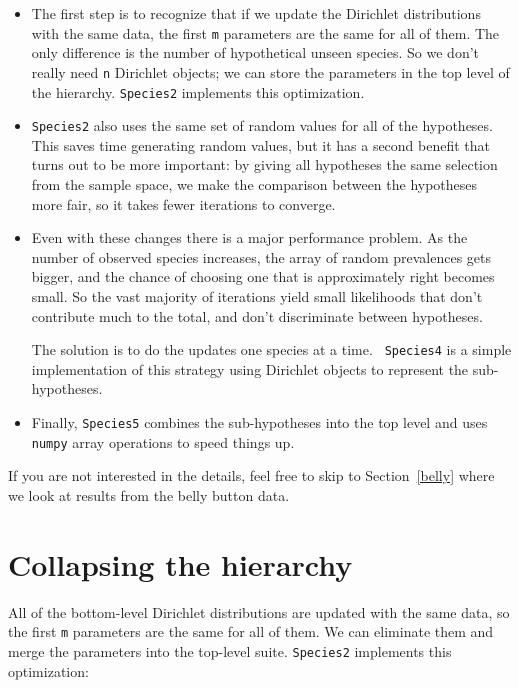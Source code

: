 \documentclass[12pt]{book}
\theoremstyle{exercise}
\begin{document}
\begin{itemize}

\item The first step is to recognize that if we update the Dirichlet
  distributions with the same data, the first {\tt m} parameters are
  the same for all of them.  The only difference is the number of
  hypothetical unseen species.  So we don't really need {\tt n}
  Dirichlet objects; we can store the parameters in the top level of
  the hierarchy.  {\tt Species2} implements this optimization.

\item {\tt Species2} also uses the same set of random values for all
  of the hypotheses.  This saves time generating random values, but it
  has a second benefit that turns out to be more important: by giving
  all hypotheses the same selection from the sample space, we make
  the comparison between the hypotheses more fair, so it takes
  fewer iterations to converge.

\item Even with these changes there is a major performance problem.
  As the number of observed species increases, the array of random
  prevalences gets bigger, and the chance of choosing one that is
  approximately right becomes small.  So the vast majority of
  iterations yield small likelihoods that don't contribute much to the
  total, and don't discriminate between hypotheses.

  The solution is to do the updates one species at a time.  {\tt
  Species4} is a simple implementation of this strategy using
  Dirichlet objects to represent the sub-hypotheses.

\item Finally, {\tt Species5} combines the sub-hypotheses into the top
  level and uses {\tt numpy} array operations to speed things up.

\end{itemize}

If you are not interested in the details, feel free to skip to
Section~\ref{belly} where we look at results from the belly
button data.


\section{Collapsing the hierarchy}
\label{collapsing}

All of the bottom-level Dirichlet distributions are updated
with the same data, so the first {\tt m} parameters are the same for
all of them.  
We can eliminate them and merge the parameters into
the top-level suite.  {\tt Species2} implements this optimization:
\end{document}
